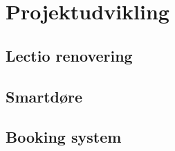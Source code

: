 \section{Projektudvikling}
    \subsection{Lectio renovering}
    \subsection{Smartdøre}
    \subsection{Booking system}